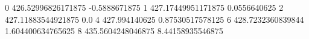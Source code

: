 0 426.52996826171875 -0.5888671875
1 427.17449951171875 0.0556640625
2 427.11883544921875 0.0
4 427.994140625 0.87530517578125
6 428.7232360839844 1.604400634765625
8 435.5604248046875 8.44158935546875
